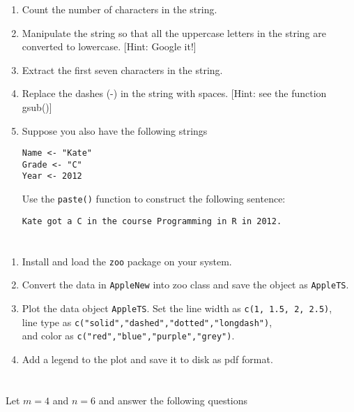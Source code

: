 \documentclass[a4paper]{article}
\begin{document}
\begin{enumerate}
\item Count the number of characters in the string.

\item Manipulate the string so that all the uppercase letters in the string are
  converted to lowercase. [Hint: Google it!]

\item Extract the first seven characters in the string.
  
\item Replace the dashes (-) in the string with spaces. [Hint: see the function gsub()]

\item Suppose you also have the following strings
\begin{verbatim}
Name <- "Kate"
Grade <- "C"
Year <- 2012
\end{verbatim}
Use the \texttt{paste()} function to construct the following sentence:
\begin{verbatim}
Kate got a C in the course Programming in R in 2012.
\end{verbatim}

\end{enumerate}

\section{}
\begin{enumerate}
\item  Install and load the \texttt{zoo} package on your system.

\item Convert the data in \texttt{AppleNew} into zoo class and save the object
  as \texttt{AppleTS}.

\item Plot the data object \texttt{AppleTS}. Set the line width as \texttt{c(1,
    1.5, 2, 2.5)}, \\ line type as
  \texttt{c("solid","dashed","dotted","longdash")},\\ and color as
  \texttt{c("red","blue","purple","grey")}.
 
\item Add a legend to the plot and save it to disk as pdf format.
\end{enumerate}
 
\section{}
 Let $m=4$ and $n=6$ and answer the following questions
\end{document}
